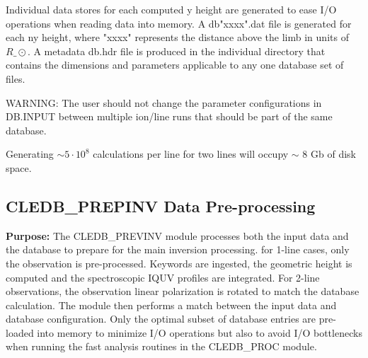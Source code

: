 \documentclass{article}
\begin{document}
Individual data stores for each computed y height are generated to ease I/O operations when reading data into memory. A db"xxxx".dat file is generated for each ny height, where "xxxx" represents the distance above the limb in units of $R\_\odot$. A metadata db.hdr file is produced in the individual directory that contains the dimensions and parameters applicable to any one database set of files.
 
WARNING: The user should not change the parameter configurations in DB.INPUT between multiple ion/line runs that should be part of the same database. 

Generating $\sim 5\cdot 10^8$ calculations per line for two lines will occupy $\sim$ 8 Gb of disk space.



\newpage
\subsection*{CLEDB\_PREPINV Data Pre-processing}


\textbf{Purpose:} The CLEDB\_PREVINV module processes both the input data and the database to prepare for the main inversion processing. for 1-line cases, only the observation is pre-processed. Keywords are ingested, the geometric height is computed and the spectroscopic IQUV profiles are integrated. For 2-line observations, the observation linear polarization is rotated to match the database calculation. The module then performs a match between the input data and database configuration. Only the optimal subset of database entries are pre-loaded into memory to minimize I/O operations but also to avoid I/O bottlenecks when running the fast analysis routines in the CLEDB\_PROC module. 

~
\end{document}
